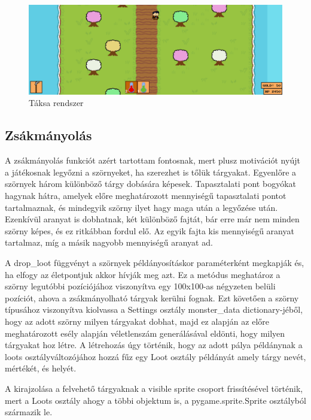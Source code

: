 \begin{figure}[H]
    \centering
    \includegraphics[width=15.5truecm]{images/inventory.png}
    \caption{Táksa rendszer}
    \label{fig:Táska rendszer}
\end{figure}

\subsection{Zsákmányolás}

\indent \indent A zsákmányolás funkciót azért tartottam fontosnak, mert plusz motivációt nyújt a játékosnak legyőzni a szörnyeket, ha szerezhet is tőlük tárgyakat. Egyenlőre a szörnyek három különböző tárgy dobására képesek. Tapasztalati pont bogyókat hagynak hátra, amelyek előre meghatározott mennyiségű tapasztalati pontot tartalmaznak, és mindegyik szörny ilyet hagy maga után a legyőzése után. Ezenkívül aranyat is dobhatnak, két különböző fajtát, bár erre már nem minden szörny képes, és ez ritkábban fordul elő. Az egyik fajta kis mennyiségű aranyat tartalmaz, míg a másik nagyobb mennyiségű aranyat ad. 

A drop\_loot függvényt a szörnyek példányosításkor paraméterként megkapják és, ha elfogy az életpontjuk akkor hívják meg azt. Ez a metódus meghatároz a szörny legutóbbi pozíciójához viszonyítva egy 100x100-as négyzeten belüli pozíciót, ahova a zsákmányolható tárgyak kerülni fognak. Ezt követően a szörny típusához viszonyítva kiolvassa a Settings osztály monster\_data dictionary-jéből, hogy az adott szörny milyen tárgyakat dobhat, majd ez alapján az előre meghatározott esély alapján véletlenszám generálásával eldönti, hogy milyen tárgyakat hoz létre. A létrehozás úgy történik, hogy az adott pálya példánynak a loots osztályváltozójához hozzá fűz egy Loot osztály példányát amely tárgy nevét, mértékét, és helyét.

A kirajzolása a felvehető tárgyaknak a visible sprite csoport frissítésével történik, mert a Loots osztály ahogy a többi objektum is, a pygame.sprite.Sprite osztályból származik le.  

